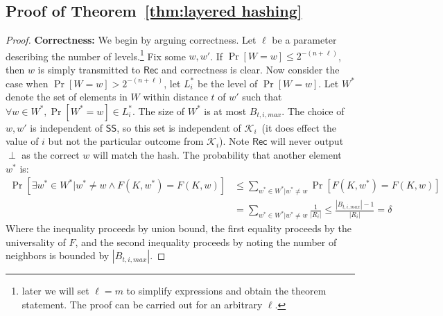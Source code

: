 \documentclass[11pt]{article}
\newcommand{\thref}[1]{\mbox{Theorem~\ref{#1}}}
\newcommand{\class}[1]{{\ensuremath{\mathsf{#1}}}}
\newcommand{\sketch}{\ensuremath{\class{SS}}\xspace}
\newcommand{\rec}{\ensuremath{\class{Rec}}\xspace}
\begin{document}
\subsection{Proof of \thref{thm:layered hashing}}
\label{sec:proof of layered hashing}
\begin{proof}
\textbf{Correctness:}  We begin by arguing correctness.  Let $\ell$ be a parameter describing the number of levels.\footnote{later we will set $\ell = m$ to simplify expressions and obtain the theorem statement.  The proof can be carried out for an arbitrary $\ell$.}  Fix some $w, w'$.  If $\Pr[W=w]\le 2^{-(n+\ell)}$, then $w$ is simply transmitted to $\rec$ and correctness is clear.  Now consider the case when $\Pr[W=w]> 2^{-(n+\ell)}$, let $L_i^*$ be the level of $\Pr[W=w]$.
Let $W^*$ denote the set of elements in $W$ within distance $t$ of $w'$ such that $\forall w \in W^*, \Pr[W^*=w]\in L_i^*$. The size of $W^*$ is at most $B_{t, i, max}$. The choice of $w, w'$ is independent of $\sketch$, so this set is independent of $\mathcal{K}_i$~(it does effect the value of $i$ but not the particular outcome from $\mathcal{K}_i$).  Note $\rec$ will never output $\perp$ as the correct $w$ will match the hash.  The probability that another element $w^*$ is:
\begin{align*}
\Pr[\exists w^* \in W^* |w^* \neq w \wedge F(K, w^*) = F(K, w)] &\le \sum_{w^*\in W^* | w^*\neq w} \Pr[F(K, w^*) = F(K, w)] \\
 &= \sum_{w^*\in W^* | w^*\neq w} \frac{1}{|R_i|} \le \frac{|B_{t, i, max}|-1}{|R_i|} = \delta
\end{align*}
Where the inequality proceeds by union bound, the first equality proceeds by the universality of $F$, and the second inequality proceeds by noting the number of neighbors is bounded by $|B_{t, i, max}|$.  


\end{proof}
\end{document}
